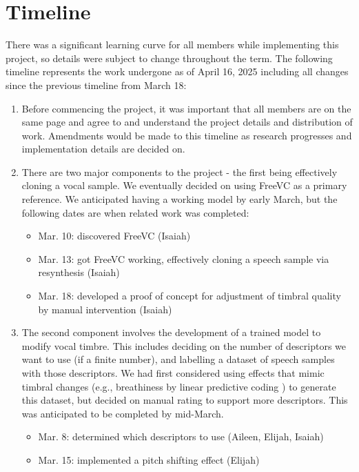 \documentclass{article}
\begin{document}
\section{Timeline}\label{sec:page_size}

There was a significant learning curve for all members while implementing this project, so details were subject to change throughout the term. The following timeline represents the work undergone as of April 16, 2025 including all changes since the previous timeline from March 18:

\begin{enumerate}
  \item Before commencing the project, it was important that all members are on the same page and agree to and understand the project details and distribution of work. Amendments would be made to this timeline as research progresses and implementation details are decided on.
  \item There are two major components to the project - the first being effectively cloning a vocal sample. We eventually decided on using FreeVC as a primary reference. We anticipated having a working model by early March, but the following dates are when related work was completed:
    \begin{itemize}
      \item Mar. 10: discovered FreeVC (Isaiah)
      \item Mar. 13: got FreeVC working, effectively cloning a speech sample via resynthesis (Isaiah)
      \item Mar. 18: developed a proof of concept for adjustment of timbral quality by manual intervention (Isaiah)
    \end{itemize}
  \item The second component involves the development of a trained model to modify vocal timbre. This includes deciding on the number of descriptors we want to use (if a finite number), and labelling a dataset of speech samples with those descriptors. We had first considered using effects that mimic timbral changes (e.g., breathiness by linear predictive coding \cite{Nordstrom08}) to generate this dataset, but decided on manual rating to support more descriptors. This was anticipated to be completed by mid-March.
    \begin{itemize}
      \item Mar. 8: determined which descriptors to use (Aileen, Elijah, Isaiah)
      \item Mar. 15: implemented a pitch shifting effect (Elijah)

\end{itemize}
\end{enumerate}
\end{document}
